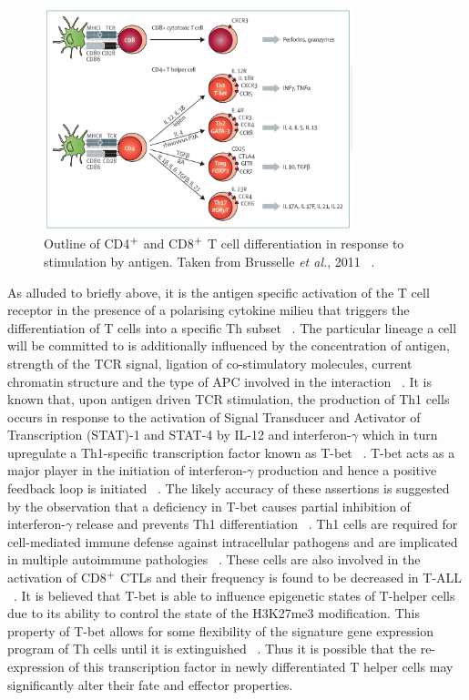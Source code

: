 \begin{figure}[H] 
    \centering
\includegraphics[width=0.8\textwidth]{Figures/Chapter2/T_cell_differentiation.png}
\caption{\small{Outline of CD4$\textsuperscript{+}$ and CD8$\textsuperscript{+}$ T cell differentiation in response to stimulation by antigen. Taken from Brusselle \textit{et al.}, 2011 ~\autocite{Bru2011}.} }
    \label{fig:6}
\end{figure}

As alluded to briefly above, it is the antigen specific activation of the T cell receptor in the presence of a polarising cytokine milieu that triggers the differentiation of T cells into a specific Th subset ~\autocite{Cha2003}. The particular lineage a cell will be committed to is additionally influenced by the concentration of antigen, strength of the TCR signal, ligation of co-stimulatory molecules, current chromatin structure and the type of APC involved in the interaction ~\autocite{Cha2003,Edw2014}. It is known that, upon antigen driven TCR stimulation, the production of Th1 cells occurs in response to the activation of Signal Transducer and Activator of Transcription (STAT)-1 and STAT-4 by IL-12 and interferon-$\gamma$ which in turn upregulate a Th1-specific transcription factor known as T-bet ~\autocite{Awa2009, Edw2014}. T-bet acts as a major player in the initiation of interferon-$\gamma$ production and hence a positive feedback loop is initiated ~\autocite{Edw2014,Tia2013}. The likely accuracy of these assertions is suggested by the observation that a deficiency in T-bet causes partial inhibition of interferon-$\gamma$ release and prevents Th1 differentiation ~\autocite{Edw2014}. Th1 cells are required for cell-mediated immune defense against intracellular pathogens and are implicated in multiple autoimmune pathologies ~\autocite{Cha2003}. These cells are also involved in the activation of CD8$\textsuperscript{+}$ CTLs and their frequency is found to be decreased in T-ALL ~\autocite{Tia2013}. It is believed that T-bet is able to influence epigenetic states of T-helper cells due to its ability to control the state of the H3K27me3 modification. This property of T-bet allows for some flexibility of the signature gene expression program of Th cells until it is extinguished ~\autocite{Mil2010}. Thus it is possible that the re-expression of this transcription factor in newly differentiated T helper cells may significantly alter their fate and effector properties. 

